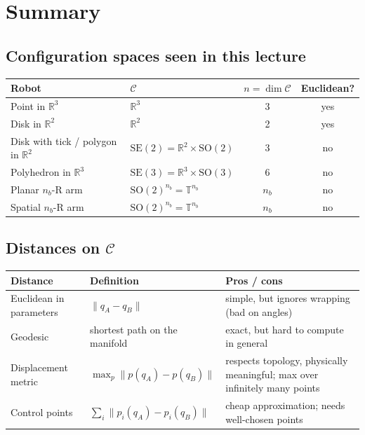 \documentclass[11pt,a4paper]{article}
\newcommand{\R}{\mathbb{R}}
\newcommand{\C}{\mathcal{C}}
\newcommand{\SO}{\mathrm{SO}}
\newcommand{\SE}{\mathrm{SE}}
\newcommand{\norm}[1]{\lVert #1\rVert}
\theoremstyle{definition}
\theoremstyle{plain}
\theoremstyle{remark}
\begin{document}
\section{Summary}

\subsection{Configuration spaces seen in this lecture}

\begin{center}
\renewcommand{\arraystretch}{1.25}
\begin{tabular}{@{}llcc@{}}
\toprule
Robot & $\C$ & $n=\dim\C$ & Euclidean? \\
\midrule
Point in $\R^3$ & $\R^3$ & 3 & yes \\
Disk in $\R^2$ & $\R^2$ & 2 & yes \\
Disk with tick / polygon in $\R^2$ & $\SE(2)=\R^2\times\SO(2)$ & 3 & no \\
Polyhedron in $\R^3$ & $\SE(3)=\R^3\times\SO(3)$ & 6 & no \\
Planar $n_b$-R arm & $\SO(2)^{n_b}=\mathbb{T}^{n_b}$ & $n_b$ & no \\
Spatial $n_b$-R arm & $\SO(2)^{n_b}=\mathbb{T}^{n_b}$ & $n_b$ & no \\
\bottomrule
\end{tabular}
\end{center}

\subsection{Distances on $\C$}

\begin{center}
\renewcommand{\arraystretch}{1.25}
\begin{tabular}{@{}p{3.3cm}p{4.2cm}p{4.6cm}@{}}
\toprule
Distance & Definition & Pros / cons \\
\midrule
Euclidean in parameters & $\norm{q_A-q_B}$ & simple, but ignores wrapping (bad on angles) \\
Geodesic & shortest path on the manifold & exact, but hard to compute in general \\
Displacement metric & $\max_p\norm{p(q_A)-p(q_B)}$ & respects topology, physically meaningful; max over infinitely many points \\
Control points & $\sum_i\norm{p_i(q_A)-p_i(q_B)}$ & cheap approximation; needs well-chosen points \\
\bottomrule
\end{tabular}
\end{center}
\end{document}
